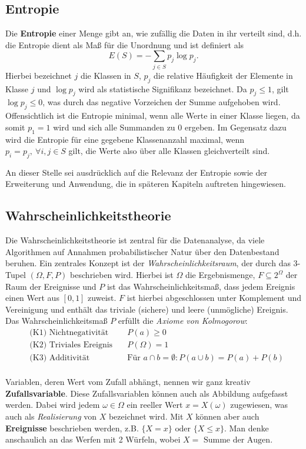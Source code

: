 \subsection{Entropie}
Die \textbf{Entropie} einer Menge gibt an, wie zufällig die Daten in ihr verteilt sind, d.h. die Entropie dient als Maß für die Unordnung und ist definiert als
\[
	E(S)=-\sum\limits_{j\in S} p_j \log{p_j}.
\]
Hierbei bezeichnet \(j\) die Klassen in \(S\), \(p_j\) die relative Häufigkeit der Elemente in Klasse \(j\) und \(\log{p_j}\) wird als statistische Signifikanz bezeichnet. Da \(p_j \leq 1 \), gilt \(\log{p_j} \leq 0\), was durch das negative Vorzeichen der Summe aufgehoben wird. Offensichtlich ist die Entropie minimal, wenn alle Werte in einer Klasse liegen, da somit \(p_1 = 1\) wird und sich alle Summanden zu \(0\) ergeben. Im Gegensatz dazu wird die Entropie für eine gegebene Klassenanzahl maximal, wenn \(p_i = p_j,\ \forall i,j\in S\) gilt, die Werte also über alle Klassen gleichverteilt sind. 

An dieser Stelle sei ausdrücklich auf die Relevanz der Entropie sowie der
Erweiterung und Anwendung, die in späteren Kapiteln auftreten hingewiesen.

\subsection{Wahrscheinlichkeitstheorie}
Die Wahrscheinlichkeitstheorie ist zentral für die Datenanalyse, da viele
Algorithmen auf Annahmen probabilistischer Natur über den Datenbestand beruhen.
Ein zentrales Konzept ist der \textit{Wahrscheinlichkeitsraum}, der durch das
3-Tupel \((\Omega, F, P)\) beschrieben wird. Hierbei ist \(\Omega\) die
Ergebnismenge, \(F\subseteq 2^{\Omega}\) der Raum der Ereignisse und \(P\) ist
das Wahrscheinlichkeitsmaß, dass jedem Ereignis einen Wert aus \([0,1]\) zuweist.
\(F\) ist hierbei abgeschlossen unter Komplement und Vereinigung und enthält
das triviale (sichere) und leere (unmögliche) Ereignis. Das
Wahrscheinlichkeitsmaß \(P\) erfüllt die \textit{Axiome von Kolmogorow}:
\begin{align*}
	&\text{(K1) Nichtnegativität}	&\quad P(a)\geq 0\\
	&\text{(K2) Triviales Ereignis}	&\quad P(\Omega) = 1\\
	&\text{(K3) Additivität}	&\quad \text{Für } a\cap b = \emptyset: P(a\cup b) = P(a) + P(b)\\
\end{align*}

\noindent Variablen, deren Wert vom Zufall abhängt, nennen wir ganz kreativ \textbf{Zufallsvariable}. Diese Zufallsvariablen können auch als Abbildung aufgefasst werden. Dabei wird jedem \(\omega \in \Omega\) ein reeller Wert \(x = X(\omega)\) zugewiesen, was auch als \textit{Realisierung} von \(X\) bezeichnet wird. Mit \(X\) können aber auch \textbf{Ereignisse} beschrieben werden, z.B. \(\{X = x\} \text{ oder } \{X \leq x\}\). Man denke anschaulich an das Werfen mit 2 Würfeln, wobei \(X = \text{ Summe der Augen}\).

